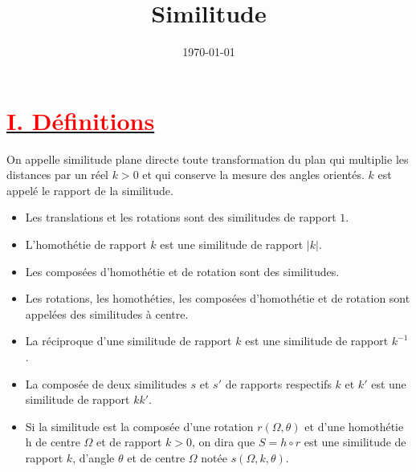 \documentclass[12pt]{article}
\title{\textbf{Similitude}}
\date{\today}
\begin{document}
\maketitle
\newpage
\section*{\underline{\textbf{\textcolor{red}{I. Définitions}}}}
On appelle similitude plane directe toute transformation du plan qui multiplie les distances par un réel $k > 0$ et qui conserve la mesure des angles orientés. $k$ est appelé le rapport de la similitude.
\begin{itemize}
    \item Les translations et les rotations sont des similitudes de rapport $1$.
    \item L'homothétie de rapport $k$ est une similitude de rapport $|k|$.
    \item Les composées d'homothétie et de rotation sont des similitudes.
    \item Les rotations, les homothéties, les composées d'homothétie et de rotation sont appelées des similitudes à centre.
    \item La réciproque d'une similitude de rapport $k$ est une similitude de rapport $k^{-1}$.
    \item La composée de deux similitudes $s$ et $s'$ de rapports respectifs $k$ et $k'$ est une similitude de rapport $kk'$.
    \item Si la similitude est la composée d'une rotation $r(\Omega,\theta)$ et d'une homothétie h de centre $\Omega$ et de rapport $k > 0$, on dira que $S = h \circ r$ est une similitude de rapport $k$, d'angle $\theta$ et de centre $\Omega$ notée $s(\Omega,k,\theta)$.
\end{itemize}
\end{document}
